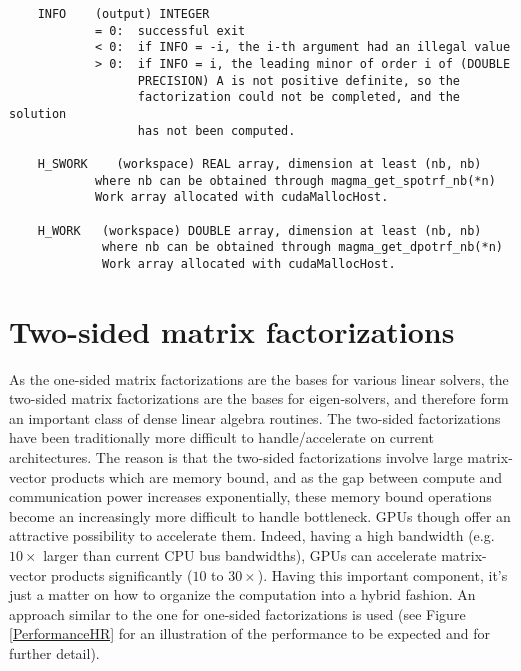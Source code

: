 \documentclass[10pt]{book}
\begin{document}
\begin{verbatim}
    INFO    (output) INTEGER
            = 0:  successful exit
            < 0:  if INFO = -i, the i-th argument had an illegal value
            > 0:  if INFO = i, the leading minor of order i of (DOUBLE
                  PRECISION) A is not positive definite, so the
                  factorization could not be completed, and the solution
                  has not been computed.

    H_SWORK    (workspace) REAL array, dimension at least (nb, nb)
            where nb can be obtained through magma_get_spotrf_nb(*n)
            Work array allocated with cudaMallocHost.

    H_WORK   (workspace) DOUBLE array, dimension at least (nb, nb)
             where nb can be obtained through magma_get_dpotrf_nb(*n)
             Work array allocated with cudaMallocHost.
\end{verbatim}

\normalsize
\newpage
\section{Two-sided matrix factorizations}

\vspace{0.1in}
As the one-sided matrix factorizations are the bases for various linear 
solvers, the two-sided matrix factorizations are the bases for eigen-solvers,
and therefore form an important class of dense linear algebra routines.
The two-sided factorizations have been traditionally more difficult to 
handle/accelerate on current architectures. The reason is that the two-sided
factorizations involve large matrix-vector products which are memory bound,
and as the gap between compute and communication power increases exponentially,
these memory bound operations become an increasingly more difficult to handle
bottleneck. GPUs though offer an attractive possibility to accelerate them.
Indeed, having a high bandwidth (e.g. $10 \times$ larger than current CPU
bus bandwidths), GPUs can accelerate matrix-vector products significantly 
($10$ to $30 \times$). Having this important component, it's just a matter 
on how to organize the computation into a hybrid fashion. An approach
similar to the one for one-sided factorizations is used (see Figure
\ref{PerformanceHR} for an illustration of the performance to be expected 
and \cite{lawn219} for further detail).
\end{document}
